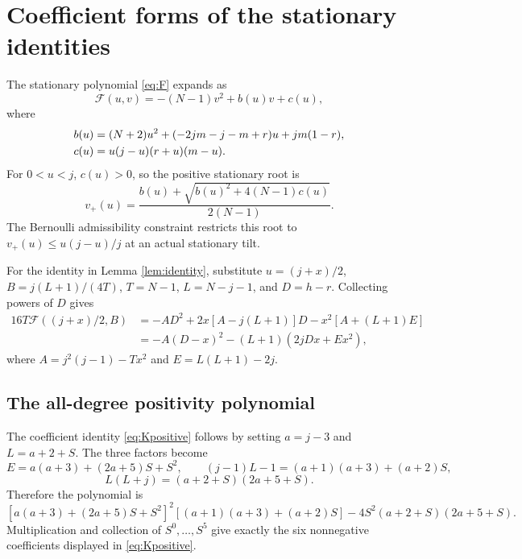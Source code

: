 \documentclass[11pt,a4paper]{article}
\begin{document}


\section{Coefficient forms of the stationary identities}\label{app:algebra}
The stationary polynomial \eqref{eq:F} expands as
\begin{equation}\label{eq:explicitF}
 \mathcal F(u,v)=-(N-1)v^2+b(u)v+c(u),
\end{equation}
where
\begin{align}\label{eq:bc}
 b(u)&=(N+2)u^2+(-2jm-j-m+r)u+jm(1-r),\\
 c(u)&=u(j-u)(r+u)(m-u).\notag
\end{align}
For $0<u<j$, $c(u)>0$, so the positive stationary root is
\begin{equation}\label{eq:vplus}
 v_+(u)=\frac{b(u)+\sqrt{b(u)^2+4(N-1)c(u)}}{2(N-1)}.
\end{equation}
The Bernoulli admissibility constraint restricts this root to $v_+(u)\le u(j-u)/j$ at an actual stationary tilt.

For the identity in Lemma \ref{lem:identity}, substitute $u=(j+x)/2$, $B=j(L+1)/(4T)$, $T=N-1$, $L=N-j-1$, and $D=h-r$. Collecting powers of $D$ gives
\begin{align*}
 16T\mathcal F((j+x)/2,B)
 &=-AD^2+2x[A-j(L+1)]D-x^2[A+(L+1)E]\\
 &=-A(D-x)^2-(L+1)(2jDx+Ex^2),
\end{align*}
where $A=j^2(j-1)-Tx^2$ and $E=L(L+1)-2j$.

\subsection{The all-degree positivity polynomial}\label{app:poly}
The coefficient identity \eqref{eq:Kpositive} follows by setting $a=j-3$ and $L=a+2+S$. The three factors become
\[
 E=a(a+3)+(2a+5)S+S^2,\qquad
 (j-1)L-1=(a+1)(a+3)+(a+2)S,
\]
\[
 L(L+j)=(a+2+S)(2a+5+S).
\]
Therefore the polynomial is
\[
 [a(a+3)+(2a+5)S+S^2]^2[(a+1)(a+3)+(a+2)S]
 -4S^2(a+2+S)(2a+5+S).
\]
Multiplication and collection of $S^0,\ldots,S^5$ give exactly the six nonnegative coefficients displayed in \eqref{eq:Kpositive}.

\end{document}
